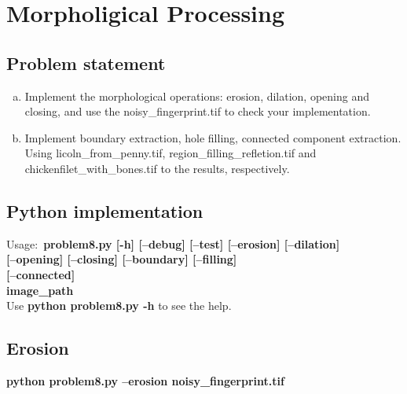 \chapter{Morpholigical Processing}

\section{Problem statement}

\begin{enumerate}[(a)]
    \item Implement the morphological operations: erosion, dilation,
    opening and closing, and use the noisy\_fingerprint.tif to check
    your implementation.

    \item Implement boundary extraction, hole filling, connected component extraction.
    Using licoln\_from\_penny.tif, region\_filling\_refletion.tif and chickenfilet\_with\_bones.tif to
    the results, respectively.
\end{enumerate}

\section{Python implementation}

Usage:~\textbf{problem8.py [-h] [--debug] [--test] [--erosion] [--dilation]} \\
\textbf{[--opening] [--closing] [--boundary] [--filling]} \\
\textbf{[--connected]} \\
\textbf{image\_path} \\

Use \textbf{python problem8.py -h} to see the help.

\pagebreak

\section{Erosion}

\textbf{python problem8.py --erosion noisy\_fingerprint.tif}

